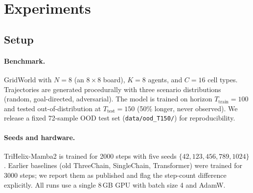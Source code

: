 \section{Experiments}
\label{sec:exp}

\subsection{Setup}
\label{sec:setup}

\paragraph{Benchmark.}
GridWorld with $N{=}8$ (an $8\times 8$ board), $K{=}8$ agents, and $C{=}16$ cell
types. Trajectories are generated procedurally with three scenario
distributions (random, goal-directed, adversarial). The model is trained on
horizon $T_{\text{train}}{=}100$ and tested out-of-distribution at
$T_{\text{test}}{=}150$ (50\% longer, never observed). We release a fixed
72-sample OOD test set (\texttt{data/ood\_T150/}) for reproducibility.

\paragraph{Seeds and hardware.}
TriHelix-Mamba2 is trained for 2000 steps with five seeds
$\{42,123,456,789,1024\}$. Earlier baselines (old ThreeChain, SingleChain,
Transformer) were trained for 3000 steps; we report them as published and flag
the step-count difference explicitly. All runs use a single 8\,GB GPU with
batch size 4 and AdamW.

